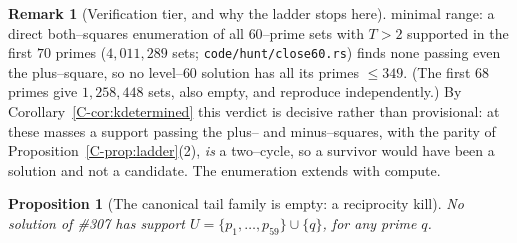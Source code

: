 \documentclass[11pt]{article}
\newtheorem{proposition}[theorem]{Proposition}
\theoremstyle{definition}
\newtheorem{remark}[theorem]{Remark}
\begin{document}
\begin{remark}[Verification tier, and why the ladder stops here]
minimal range: a direct both--squares enumeration of all $60$--prime sets with $T>2$ supported in
the first $70$ primes ($4{,}011{,}289$ sets; \texttt{code/hunt/close60.rs}) finds none passing even the
plus--square, so no level--$60$ solution has all its primes $\le349$. (The first $68$ primes give
$1{,}258{,}448$ sets, also empty, and reproduce independently.) By
Corollary~\ref{C-cor:kdetermined} this verdict is decisive rather than provisional: at these masses a
support passing the plus-- and minus--squares, with the parity of Proposition~\ref{C-prop:ladder}(2),
\emph{is} a two--cycle, so a survivor would have been a solution and not a candidate. The
enumeration extends with compute.
\end{remark}

\begin{proposition}[The canonical tail family is empty: a reciprocity kill]\label{prop:tailkill}
No solution of \#307 has support $U=\{p_1,\dots,p_{59}\}\cup\{q\}$, for any prime $q$.
\end{proposition}
\end{document}
